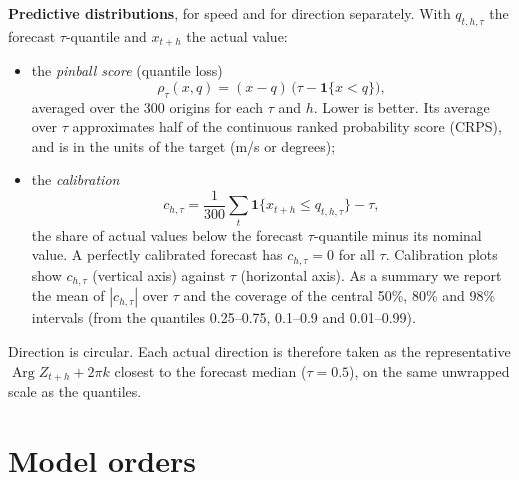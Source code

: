 \documentclass[11pt,a4paper]{article}
\DeclareMathOperator{\Arg}{Arg}
\newcommand{\1}{\mathbf{1}}
\begin{document}
\textbf{Predictive distributions}, for speed and for direction separately. With $q_{t,h,\tau}$ the
forecast $\tau$-quantile and $x_{t+h}$ the actual value:
\begin{itemize}
  \item the \emph{pinball score} (quantile loss)
    \begin{equation}
      \rho_\tau(x, q) = (x - q)\,\bigl(\tau - \1\{x < q\}\bigr),
    \end{equation}
    averaged over the 300 origins for each $\tau$ and $h$. Lower is better. Its average over
    $\tau$ approximates half of the continuous ranked probability score (CRPS), and is in the units
    of the target (m/s or degrees);
  \item the \emph{calibration}
    \begin{equation}
      c_{h,\tau} = \frac{1}{300}\sum_t \1\{x_{t+h} \le q_{t,h,\tau}\} - \tau,
    \end{equation}
    the share of actual values below the forecast $\tau$-quantile minus its nominal value. A
    perfectly calibrated forecast has $c_{h,\tau} = 0$ for all $\tau$. Calibration plots show
    $c_{h,\tau}$ (vertical axis) against $\tau$ (horizontal axis). As a summary we report the mean
    of $|c_{h,\tau}|$ over $\tau$ and the coverage of the central 50\%, 80\% and 98\% intervals
    (from the quantiles 0.25--0.75, 0.1--0.9 and 0.01--0.99).
\end{itemize}
Direction is circular. Each actual direction is therefore taken as the representative
$\Arg Z_{t+h} + 2\pi k$ closest to the forecast median ($\tau = 0.5$), on the same unwrapped scale
as the quantiles.

\section{Model orders}\label{sec:orders}
\end{document}

